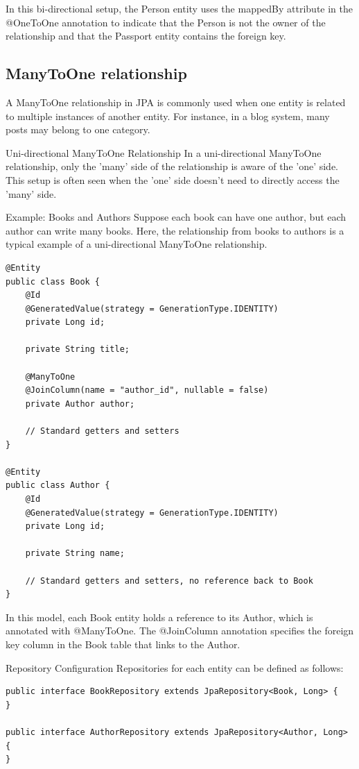 In this bi-directional setup, the Person entity uses the mappedBy attribute in the @OneToOne annotation to indicate that the Person is not the owner of the relationship and that the Passport entity contains the foreign key.

\subsection{ManyToOne relationship}

A ManyToOne relationship in JPA is commonly used when one entity is related to multiple instances of another entity. For instance, in a blog system, many posts may belong to one category.

Uni-directional ManyToOne Relationship
In a uni-directional ManyToOne relationship, only the 'many' side of the relationship is aware of the 'one' side. This setup is often seen when the 'one' side doesn't need to directly access the 'many' side.

Example: Books and Authors
Suppose each book can have one author, but each author can write many books. Here, the relationship from books to authors is a typical example of a uni-directional ManyToOne relationship.

\begin{lstlisting}
@Entity
public class Book {
    @Id
    @GeneratedValue(strategy = GenerationType.IDENTITY)
    private Long id;

    private String title;

    @ManyToOne
    @JoinColumn(name = "author_id", nullable = false)
    private Author author;

    // Standard getters and setters
}

@Entity
public class Author {
    @Id
    @GeneratedValue(strategy = GenerationType.IDENTITY)
    private Long id;

    private String name;

    // Standard getters and setters, no reference back to Book
}
\end{lstlisting}

In this model, each Book entity holds a reference to its Author, which is annotated with @ManyToOne. The @JoinColumn annotation specifies the foreign key column in the Book table that links to the Author.

Repository Configuration
Repositories for each entity can be defined as follows:

\begin{lstlisting}
public interface BookRepository extends JpaRepository<Book, Long> {
}

public interface AuthorRepository extends JpaRepository<Author, Long> {
}
\end{lstlisting}

